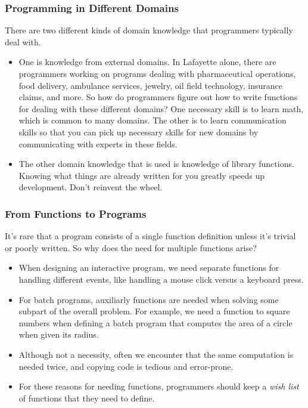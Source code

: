\documentclass{beamer}
\begin{document}
\begin{frame}
  \frametitle{Programming in Different Domains}
  There are two different kinds of domain knowledge that programmers typically deal with.
  \begin{itemize}
  \item<2-> One is knowledge from external domains. In Lafayette alone, there are programmers working on programs dealing with pharmaceutical operations, food  delivery, ambulance services, jewelry, oil field technology, insurance claims, and more. So  how do programmers figure out how to write functions
    for dealing with these different domains? One necessary skill is to learn math, which is common to many domains. The other is to learn communication skills so that you can pick up necessary skills for new domains by communicating with experts in these fields.
  \item<3-> The other domain knowledge that is used is knowledge of library functions. Knowing what things are already written for you greatly speeds up development.
    Don't reinvent the wheel.
  \end{itemize}  
\end{frame}

\begin{frame}
  \frametitle{From Functions to Programs}
  It's rare that a program consists of a single function definition unless it's trivial or poorly written. So why does the need for multiple functions arise?
  \begin{itemize}
  \item<2-> When designing an interactive program, we need separate functions for handling different events, like handling a mouse click versus a keyboard press.
  \item<3-> For batch programs, auxiliarly functions are needed when solving some subpart of the overall problem. For example, we need a function to square numbers
    when defining a batch program that computes the area of a circle when given its radius.
  \item<4-> Although not a necessity, often we encounter that the same computation is needed twice, and copying code is tedious and error-prone.
  \item<5-> For these reasons for needing functions, programmers should keep a \emph{wish list} of functions that they need to define.
  \end{itemize}
  
\end{frame}
\end{document}
